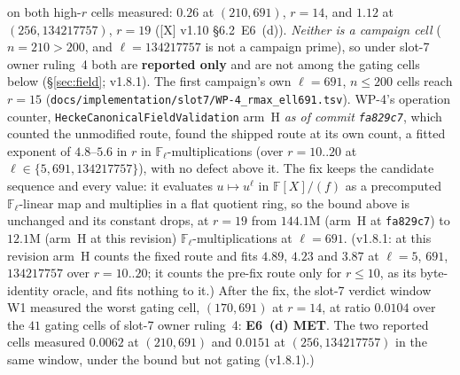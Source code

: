 \documentclass[11pt]{article}
\theoremstyle{remark}
\newcommand{\F}{\mathbb{F}}
\newcommand{\Fl}{\F_\ell}
\begin{document}
on both high-$r$ cells measured: $0.26$ at $(210,691)$, $r=14$, and $1.12$ at $(256,134217757)$,
$r=19$ ([X] v1.10 \S6.2~E6~(d)). \emph{Neither is a campaign cell} ($n=210>200$, and
$\ell=134217757$ is not a campaign prime), so under slot-7 owner ruling~4 both are
\textbf{reported only} and are not among the gating cells below (\S\ref{sec:field}; v1.8.1). The
first campaign's own $\ell=691$, $n\le200$ cells reach $r=15$
(\texttt{docs/implementation/slot7/WP-4\_rmax\_ell691.tsv}). WP-4's operation counter,
\texttt{HeckeCanonicalFieldValidation} arm~H \emph{as of commit \texttt{fa829c7}}, which counted
the unmodified route, found
the shipped route at its own count, a fitted exponent of $4.8$--$5.6$ in $r$ in
$\Fl$-multiplications (over $r=10..20$ at $\ell\in\{5,691,134217757\}$), with no defect above it.
The fix keeps the candidate sequence and every
value: it evaluates $u\mapsto u^\ell$ in $\F[X]/(f)$ as a precomputed $\Fl$-linear map and
multiplies in a flat quotient ring, so the bound above is unchanged and its constant drops, at
$r=19$ from $144.1$M (arm~H at \texttt{fa829c7}) to $12.1$M (arm~H at this revision)
$\Fl$-multiplications at $\ell=691$. (v1.8.1: at this revision arm~H counts the fixed route and
fits $4.89$, $4.23$ and $3.87$ at $\ell=5$, $691$, $134217757$ over $r=10..20$; it counts the
pre-fix route only for $r\le10$, as its byte-identity oracle, and fits nothing to it.) After the
fix, the slot-7
verdict window W1 measured the worst gating cell, $(170,691)$ at $r=14$, at ratio $0.0104$ over
the $41$ gating cells of slot-7 owner ruling~4: \textbf{E6~(d) MET}. The two reported cells
measured $0.0062$ at $(210,691)$ and $0.0151$ at $(256,134217757)$ in the same window, under the
bound but not gating (v1.8.1).)

\end{document}

